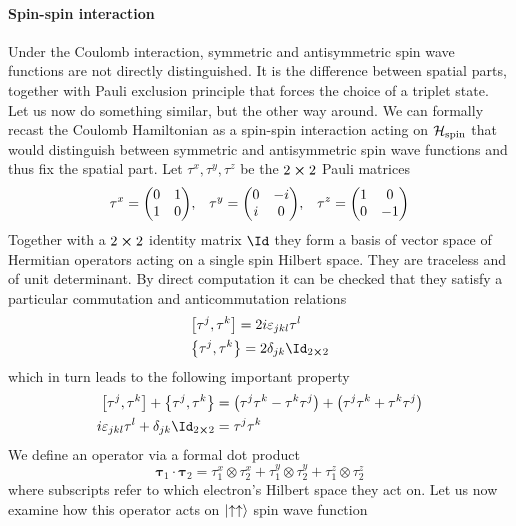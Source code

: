 \paragraph{Spin-spin interaction}Under the Coulomb interaction, symmetric and antisymmetric spin wave functions are not
directly distinguished. It is the difference between spatial parts, together with Pauli
exclusion principle that forces the choice of a triplet state. Let us now do something
similar, but the other way around. We can formally recast the Coulomb Hamiltonian as a
spin-spin interaction acting on \(\mathcal{H}_{\textrm{spin}}\) that would distinguish
between symmetric and antisymmetric spin wave functions and thus fix the spatial part.
Let \(\tau^x,\tau^y,\tau^z\) be the \(2\cross 2\) Pauli matrices
\begin{equation}
\tau^x = \mqty(\pmat{1}),\;\;\;\tau^y = \mqty(\pmat{2}),\;\;\;\tau^z= \mqty(\pmat{3})
\label{eq:Pauli matrices}
\end{equation}
Together with a \(2\cross 2\) identity matrix \(\Id\) they form a basis of vector space of
Hermitian operators acting on a single spin Hilbert space.
They are traceless and of unit determinant. By direct computation it can be checked that
they satisfy a particular commutation and anticommutation relations
\begin{align}
    &\comm{\tau^j}{\tau^k} = 2 i \varepsilon_{jkl}\tau^{l}\\
    &\anticommutator{\tau^j}{\tau^k} = 2 \delta_{jk} \Id_{2\cross 2}
\end{align}
which in turn leads to the following important property
\begin{align}
        \comm{\tau^{j}}{\tau^{k}} + \anticommutator{\tau^{j}}{\tau^{k}} 
    &=\left(\tau^{j} \tau^{k}-\tau^{k} \tau^{j}\right)+\left(\tau^{j} \tau^{k}+\tau^{k} 
    \tau^{j}\right) \nonumber \\
    i \varepsilon_{j k l} \tau^{l}+\delta_{j k} \Id_{2\cross 2} &= \tau^{j} \tau^{k}
\end{align}
We define an operator via a formal dot product
\begin{equation}
    \bm{\tau}_1 \cdot \bm{\tau}_2 = \tau_1^x \otimes \tau_2^x + \tau_1^y \otimes \tau_2^y +
    \tau_1^z \otimes \tau_2^z  
\end{equation}
where subscripts refer to which electron's Hilbert space they act on. 
Let us now examine how this operator acts on \(\ket{\uparrow\uparrow}\) spin wave function
